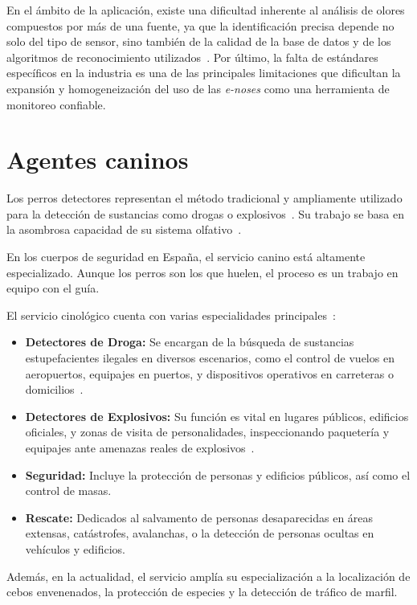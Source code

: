 En el ámbito de la aplicación, existe una dificultad inherente al análisis de olores compuestos por más de una fuente, ya que la identificación precisa depende no solo del tipo de sensor, sino también de la calidad de la base de datos y de los algoritmos de reconocimiento utilizados~\cite{ChenSongBiMengWu2018}. Por último, la falta de estándares específicos en la industria es una de las principales limitaciones que dificultan la expansión y homogeneización del uso de las \textit{e-noses} como una herramienta de monitoreo confiable.

\section{Agentes caninos}
Los perros detectores representan el método tradicional y ampliamente utilizado para la detección de sustancias como drogas o explosivos~\cite{FurtonMyers2001}. Su trabajo se basa en la asombrosa capacidad de su sistema olfativo~\cite{GuardiaCivil2025}.
\par

En los cuerpos de seguridad en España, el servicio canino está altamente especializado. Aunque los perros son los que huelen, el proceso es un trabajo en equipo con el guía.
\par

El servicio cinológico cuenta con varias especialidades principales~\cite{GuardiaCivil2025}:
\begin{itemize}
    \item \textbf{Detectores de Droga: }Se encargan de la búsqueda de sustancias estupefacientes ilegales en diversos escenarios, como el control de vuelos en aeropuertos, equipajes en puertos, y dispositivos operativos en carreteras o domicilios~\cite{LorenzoEtAl2003}.
    \item \textbf{Detectores de Explosivos: }Su función es vital en lugares públicos, edificios oficiales, y zonas de visita de personalidades, inspeccionando paquetería y equipajes ante amenazas reales de explosivos~\cite{LazarowskiDorman2014,HarperEtAl2005}.
    \item \textbf{Seguridad: }Incluye la protección de personas y edificios públicos, así como el control de masas.
    \item \textbf{Rescate: }Dedicados al salvamento de personas desaparecidas en áreas extensas, catástrofes, avalanchas, o la detección de personas ocultas en vehículos y edificios.
\end{itemize}
Además, en la actualidad, el servicio amplía su especialización a la localización de cebos envenenados, la protección de especies y la detección de tráfico de marfil.
\par

